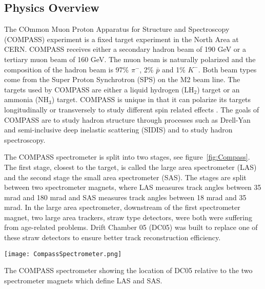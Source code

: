 \documentclass[aps,prl,twocolumn,groupedaddress]{revtex4-1}
\begin{document}
\pacs{}

\maketitle

\subsection{Physics Overview}
The COmmon Muon Proton Apparatus for Structure and Spectroscopy (COMPASS)
experiment is a fixed target experiment in the North Area at CERN.  COMPASS
receives either a secondary hadron beam of 190 GeV or a tertiary muon beam of
160 GeV.  The muon beam is naturally polarized and the composition of the hadron
beam is 97\% $\pi^-$, 2\% $\bar{p}$ and 1\% $K^-$.  Both beam types come from
the Super Proton Synchrotron (SPS) on the M2 beam line. The targets used by
COMPASS are either a liquid hydrogen (LH$_2$) target or an ammonia (NH$_3$)
target.  COMPASS is unique in that it can polarize its targets longitudinally or
transversely to study different spin related effects \cite{compass}.  The goals
of COMPASS are to study hadron structure through processes such as Drell-Yan and
semi-inclusive deep inelastic scattering (SIDIS) and to study hadron
spectroscopy. \par The COMPASS spectrometer is split into two stages,
see figure~\ref{fig:Compass}.  The first stage, closest to the target, is called the
large area spectrometer (LAS) and the second stage the small area
spectrometer (SAS).  The stages are split between two spectrometer magnets, where
LAS measures track angles between 35 mrad and 180 mrad and SAS measures track
angles between 18 mrad and 35 mrad.  In the large area spectrometer,
downstream of the first spectrometer magnet, two large area trackers, straw type
detectors, were both were suffering from age-related problems.  Drift Chamber 05 (DC05)
was built to replace one of these straw detectors to ensure better track
reconstruction efficiency.

\begin{figure*}
  \centering \texttt{[image: CompassSpectrometer.png]}
  \caption{}{The COMPASS spectrometer showing the location of DC05 relative to the two spectrometer magnets which define LAS and SAS. }
  \label{fig:Compass}%
\end{figure*}
\end{document}
